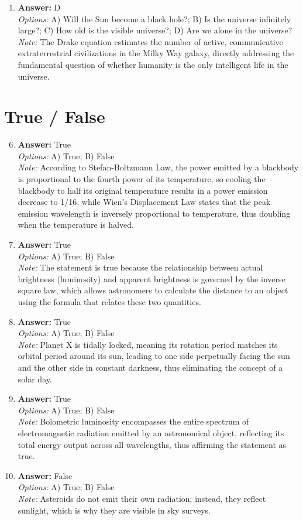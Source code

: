 \documentclass[12pt]{article}
\begin{document}
\begin{enumerate}[label=\arabic*.]
\item \textbf{Answer:} D
\\ \textit{Options:} A) Will the Sun become a black hole?; B) Is the universe infinitely large?; C) How old is the visible universe?; D) Are we alone in the universe?
\\ \textit{Note:} The Drake equation estimates the number of active, communicative extraterrestrial civilizations in the Milky Way galaxy, directly addressing the fundamental question of whether humanity is the only intelligent life in the universe.
\end{enumerate}

\section*{True / False}
\begin{enumerate}[label=\arabic*.]
\setcounter{enumi}{5}
\item \textbf{Answer:} True
\\ \textit{Options:} A) True; B) False
\\ \textit{Note:} According to Stefan-Boltzmann Law, the power emitted by a blackbody is proportional to the fourth power of its temperature, so cooling the blackbody to half its original temperature results in a power emission decrease to 1/16, while Wien's Displacement Law states that the peak emission wavelength is inversely proportional to temperature, thus doubling when the temperature is halved.
\item \textbf{Answer:} True
\\ \textit{Options:} A) True; B) False
\\ \textit{Note:} The statement is true because the relationship between actual brightness (luminosity) and apparent brightness is governed by the inverse square law, which allows astronomers to calculate the distance to an object using the formula that relates these two quantities.
\item \textbf{Answer:} True
\\ \textit{Options:} A) True; B) False
\\ \textit{Note:} Planet X is tidally locked, meaning its rotation period matches its orbital period around its sun, leading to one side perpetually facing the sun and the other side in constant darkness, thus eliminating the concept of a solar day.
\item \textbf{Answer:} True
\\ \textit{Options:} A) True; B) False
\\ \textit{Note:} Bolometric luminosity encompasses the entire spectrum of electromagnetic radiation emitted by an astronomical object, reflecting its total energy output across all wavelengths, thus affirming the statement as true.
\item \textbf{Answer:} False
\\ \textit{Options:} A) True; B) False
\\ \textit{Note:} Asteroids do not emit their own radiation; instead, they reflect sunlight, which is why they are visible in sky surveys.
\end{enumerate}
\end{document}
